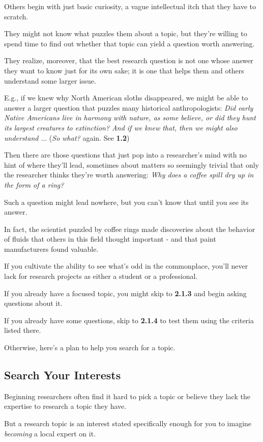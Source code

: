 \documentclass[oneside]{book}
\numberwithin{equation}{section}
\begin{document}
Others begin with just basic curiosity, a vague intellectual itch that they have to scratch.

They might not know what puzzles them about a topic, but they're willing to spend time to find out whether that topic can yield a question worth answering.

%
They realize, moreover, that the best research question is not one whose answer they want to know just for its own sake; it is one that helps them and others understand some larger issue.

E.g., if we knew why North American sloths disappeared, we might be able to answer a larger question that puzzles many historical anthropologists: \textit{Did early Native Americans live in harmony with nature, as some believe, or did they hunt its largest creatures to extinction? And if we knew that, then we might also understand $\ldots$} (\textit{So what?} again. See \textbf{1.2})

%
Then there are those questions that just pop into a researcher's mind with no hint of where they'll lead, sometimes about matters so seemingly trivial that only the researcher thinks they're worth answering: \textit{Why does a coffee spill dry up in the form of a ring?}

Such a question might lead nowhere, but you can't know that until you see its answer.

In fact, the scientist puzzled by coffee rings made discoveries about the behavior of fluids that others in this field thought important - and that paint manufacturers found valuable.

If you cultivate the ability to see what's odd in the commonplace, you'll never lack for research projects as either a student or a professional.

%
If you already have a focused topic, you might skip to \textbf{2.1.3} and begin asking questions about it.

If you already have some questions, skip to \textbf{2.1.4} to test them using the criteria listed there.

Otherwise, here's a plan to help you search for a topic.

\subsection{Search Your Interests}
Beginning researchers often find it hard to pick a topic or believe they lack the expertise to research a topic they have.

But a research topic is an interest stated specifically enough for you to imagine \textit{becoming} a local expert on it.
\end{document}
